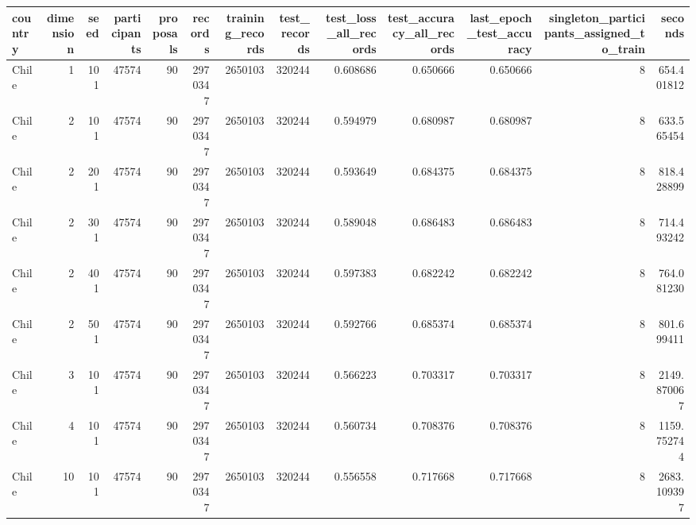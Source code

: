 \begin{tabular}{lrrrrrrrrrrrr}
\toprule
country & dimension & seed & participants & proposals & records & training_records & test_records & test_loss_all_records & test_accuracy_all_records & last_epoch_test_accuracy & singleton_participants_assigned_to_train & seconds \\
\midrule
Chile & 1 & 101 & 47574 & 90 & 2970347 & 2650103 & 320244 & 0.608686 & 0.650666 & 0.650666 & 8 & 654.401812 \\
Chile & 2 & 101 & 47574 & 90 & 2970347 & 2650103 & 320244 & 0.594979 & 0.680987 & 0.680987 & 8 & 633.565454 \\
Chile & 2 & 201 & 47574 & 90 & 2970347 & 2650103 & 320244 & 0.593649 & 0.684375 & 0.684375 & 8 & 818.428899 \\
Chile & 2 & 301 & 47574 & 90 & 2970347 & 2650103 & 320244 & 0.589048 & 0.686483 & 0.686483 & 8 & 714.493242 \\
Chile & 2 & 401 & 47574 & 90 & 2970347 & 2650103 & 320244 & 0.597383 & 0.682242 & 0.682242 & 8 & 764.081230 \\
Chile & 2 & 501 & 47574 & 90 & 2970347 & 2650103 & 320244 & 0.592766 & 0.685374 & 0.685374 & 8 & 801.699411 \\
Chile & 3 & 101 & 47574 & 90 & 2970347 & 2650103 & 320244 & 0.566223 & 0.703317 & 0.703317 & 8 & 2149.870067 \\
Chile & 4 & 101 & 47574 & 90 & 2970347 & 2650103 & 320244 & 0.560734 & 0.708376 & 0.708376 & 8 & 1159.752744 \\
Chile & 10 & 101 & 47574 & 90 & 2970347 & 2650103 & 320244 & 0.556558 & 0.717668 & 0.717668 & 8 & 2683.109397 \\
\bottomrule
\end{tabular}
